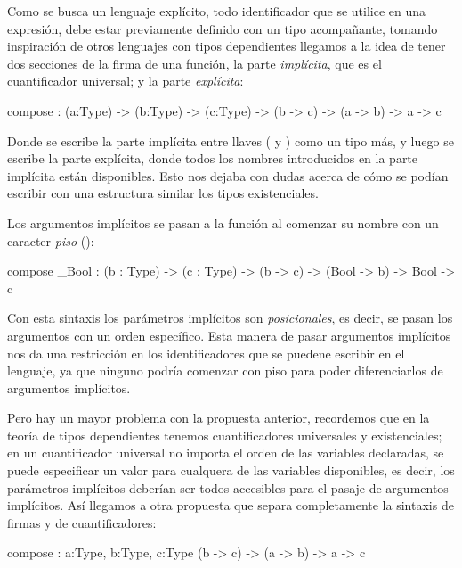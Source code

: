 {\begin{designfr}
Como se busca un lenguaje explícito, todo identificador que se utilice en una expresión, debe estar previamente definido con un tipo acompañante, tomando inspiración de otros lenguajes con tipos dependientes llegamos a la idea de tener dos secciones de la firma de una función, la parte \emph{implícita}, que es el cuantificador universal; y la parte \emph{explícita}:

\begin{anglercode}
compose : { (a:Type) -> (b:Type) -> (c:Type) } -> (b -> c) -> (a -> b) -> a -> c
\end{anglercode}

Donde se escribe la parte implícita entre llaves (\inlinecode{\{} y \inlinecode{\}}) como un tipo más, y luego se escribe la parte explícita, donde todos los nombres introducidos en la parte implícita están disponibles. Esto nos dejaba con dudas acerca de cómo se podían escribir con una estructura similar los tipos existenciales.

Los argumentos implícitos se pasan a la función al comenzar su nombre con un caracter \emph{piso} (\inlinecode{\_}):

\begin{anglercode}
compose _Bool : { (b : Type) -> (c : Type) } -> (b -> c) -> (Bool -> b) -> Bool -> c
\end{anglercode}

Con esta sintaxis los parámetros implícitos son \emph{posicionales}, es decir, se pasan los argumentos con un orden específico. Esta manera de pasar argumentos implícitos nos da una restricción en los identificadores que se puedene escribir en el lenguaje, ya que ninguno podría comenzar con piso para poder diferenciarlos de argumentos implícitos.

Pero hay un mayor problema con la propuesta anterior, recordemos que en la teoría de tipos dependientes tenemos cuantificadores universales y existenciales; en un cuantificador universal no importa el orden de las variables declaradas, se puede especificar un valor para cualquera de las variables disponibles, es decir, los parámetros implícitos deberían ser todos accesibles para el pasaje de argumentos implícitos. Así llegamos a otra propuesta que separa completamente la sintaxis de firmas y de cuantificadores:

\begin{anglercode}
compose : { a:Type, b:Type, c:Type } (b -> c) -> (a -> b) -> a -> c
\end{anglercode}


\end{designfr}}
